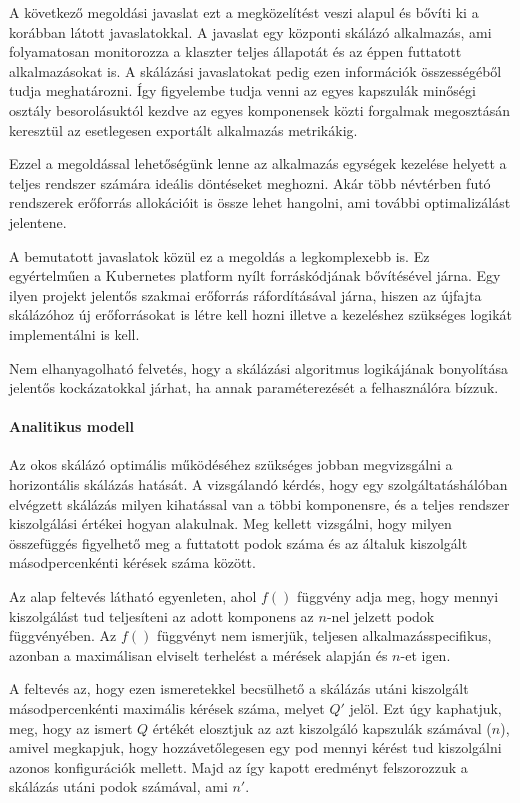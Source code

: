 A következő megoldási javaslat ezt a megközelítést veszi alapul és bővíti ki a korábban látott javaslatokkal.
A javaslat egy központi skálázó alkalmazás, ami folyamatosan monitorozza a klaszter teljes állapotát és az éppen futtatott alkalmazásokat is.
A skálázási javaslatokat pedig ezen információk összességéből tudja meghatározni.
Így figyelembe tudja venni az egyes kapszulák minőségi osztály besorolásuktól kezdve az egyes komponensek közti forgalmak megosztásán keresztül az esetlegesen exportált alkalmazás metrikákig.

Ezzel a megoldással lehetőségünk lenne az alkalmazás egységek kezelése helyett a teljes rendszer számára ideális döntéseket meghozni.
Akár több névtérben futó rendszerek erőforrás allokációit is össze lehet hangolni, ami további optimalizálást jelentene.

A bemutatott javaslatok közül ez a megoldás a legkomplexebb is. 
Ez egyértelműen a Kubernetes platform nyílt forráskódjának bővítésével járna.
Egy ilyen projekt jelentős szakmai erőforrás ráfordításával járna, hiszen az újfajta skálázóhoz új erőforrásokat is létre kell hozni illetve a kezeléshez szükséges logikát implementálni is kell.

Nem elhanyagolható felvetés, hogy a skálázási algoritmus logikájának bonyolítása jelentős kockázatokkal járhat, ha annak paraméterezését a felhasználóra bízzuk.

\paragraph{Analitikus modell}
Az okos skálázó optimális működéséhez szükséges jobban megvizsgálni a horizontális skálázás hatását.
A vizsgálandó kérdés, hogy egy szolgáltatáshálóban elvégzett skálázás milyen kihatással van a többi komponensre, és a teljes rendszer kiszolgálási értékei hogyan alakulnak.
Meg kellett vizsgálni, hogy milyen összefüggés figyelhető meg a futtatott podok száma és az általuk kiszolgált másodpercenkénti kérések száma között.

Az alap feltevés látható  egyenleten, ahol $f()$ függvény adja meg, hogy mennyi kiszolgálást tud teljesíteni az adott komponens az $n$-nel jelzett podok függvényében.
Az $f()$ függvényt nem ismerjük, teljesen alkalmazásspecifikus, azonban a maximálisan elviselt terhelést a mérések alapján és $n$-et igen.

A feltevés az, hogy ezen ismeretekkel becsülhető a skálázás utáni kiszolgált másodpercenkénti maximális kérések száma, melyet $Q'$ jelöl. 
Ezt úgy kaphatjuk, meg, hogy az ismert $Q$ értékét elosztjuk az azt kiszolgáló kapszulák számával ($n$), amivel megkapjuk, hogy hozzávetőlegesen egy pod mennyi kérést tud kiszolgálni azonos konfigurációk mellett.
Majd az így kapott eredményt felszorozzuk a skálázás utáni podok számával, ami $n'$. 

